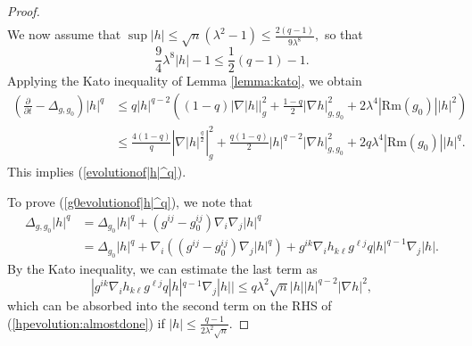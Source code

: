 \documentclass[12pt]{amsart}
\newcommand{\p}{{ \partial}}
\renewcommand{\1}{{\mathbf 1}}
\newcommand{\Rm}{\mathrm{Rm}}
\renewcommand{\p}{{\partial}}
\theoremstyle{others}
\numberwithin{equation}{section}
\begin{document}
\begin{proof}
\begin{equation*}
\begin{split}
       \end{split}
   \end{equation*}
    We now assume that $\sup |h| \leq \sqrt{n} \left(\lambda^2 - 1 \right) \leq \frac{2 (q-1)}{9 \lambda^8},$ so that 
   $$\frac{9}{4} \lambda^8 |h| - 1 \leq \frac12 (q - 1) - 1.$$
 Applying the Kato inequality of Lemma \ref{lemma:kato}, we obtain
         \begin{equation}\label{hpevolution:almostdone}
       \begin{split}
           \left( \frac{\p}{\p t} - \Delta_{g, g_0} \right) |h|^q 
           & \leq q |h|^{q-2} \left( (1-q) | \nabla |h| |_g^2 + \frac{1 - q}{2} |\nabla h|_{g,g_0}^2 + 2\lambda^4 |\Rm(g_0)| |h|^2 \right) \\
           & \leq \frac{4(1 - q)}{q} \left| \nabla |h|^{\frac{q}{2}} \right|_g^2  + \frac{q(1 - q)}{2} |h|^{q-2} |\nabla h |^2_{g,g_0} + 2 q \lambda^4 |\Rm(g_0) ||h|^q.
       \end{split}
   \end{equation}
   This implies (\ref{evolutionof|h|^q}).

   To prove (\ref{g0evolutionof|h|^q}), we note that
   \begin{equation}
   \begin{split}
   \Delta_{g,g_0} |h|^q & = \Delta_{g_0} |h|^q + (g^{ij} - g_0^{ij}) \nabla_i \nabla_j |h|^q \\
   & = \Delta_{g_0}|h|^q + \nabla_i \left( (g^{ij} - g_0^{ij})  \nabla_j|h|^q \right) + g^{ik} \nabla_i h_{k\ell} g^{\ell j} q |h|^{q-1}\nabla_j |h|.
   \end{split}
   \end{equation}
   By the Kato inequality, we can estimate the last term as
   $$ | g^{ik} \nabla_i h_{k\ell} g^{\ell j} q |h|^{q-1}\nabla_j |h| | \leq q \lambda^2 \sqrt{n} |h| |h|^{q-2} |\nabla h |^2,$$
   which can be absorbed into the second term on the RHS of (\ref{hpevolution:almostdone}) if $|h| \leq \frac{q-1}{2 \lambda^2 \sqrt{n}}.$
\end{proof}
\end{document}
